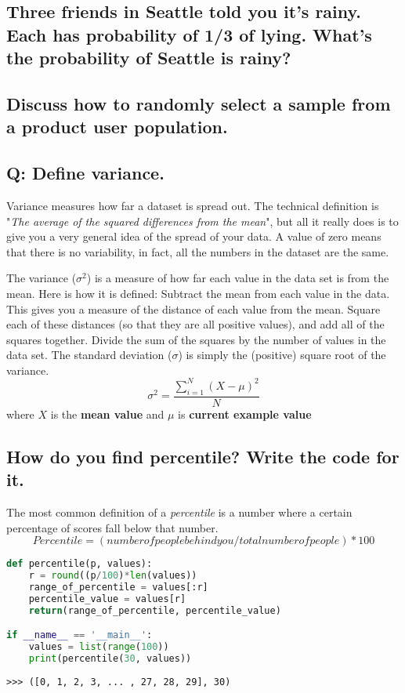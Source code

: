 \subsection{Three friends in Seattle told you it's rainy. Each has probability of 1/3 of lying. What's the probability of Seattle is rainy?}
\subsection{Discuss how to randomly select a sample from a product user population.}
\subsection{Q: Define variance.}
\bigskip
Variance measures how far a dataset is spread out. The technical definition is "\textit{The average of the squared differences from the mean}", but all it really does is to give you a very general idea of the spread of your data. A value of zero means that there is no variability, in fact, all the numbers in the dataset are the same.\par
\bigskip
The variance (${\sigma}^2$) is a measure of how far each value in the data set is from the mean. Here is how it is defined: 
Subtract the mean from each value in the data. This gives you a measure of the distance of each value from the mean.
Square each of these distances (so that they are all positive values), and add all of the squares together.
Divide the sum of the squares by the number of values in the data set.
The standard deviation ($\sigma$) is simply the (positive) square root of the variance. 
\bigskip
\[
{\sigma}^2 = \frac{\sum_{i=1}^{N} {(X - \mu)}^2}{N}
\]
where $X$ is the \textbf{mean value} and $\mu$ is \textbf{current example value}
\bigskip
\subsection{How do you find percentile? Write the code for it.}
The most common definition of a \textit{percentile} is a number where a certain percentage of scores fall below that number. $$Percentile = (number of people behind you / total number of people) * 100$$

\begin{lstlisting}[language=python]
def percentile(p, values):
    r = round((p/100)*len(values))
    range_of_percentile = values[:r]
    percentile_value = values[r]
    return(range_of_percentile, percentile_value)

if __name__ == '__main__':
    values = list(range(100))
    print(percentile(30, values))
\end{lstlisting}
 
\begin{lstlisting}
>>> ([0, 1, 2, 3, ... , 27, 28, 29], 30)
\end{lstlisting}
